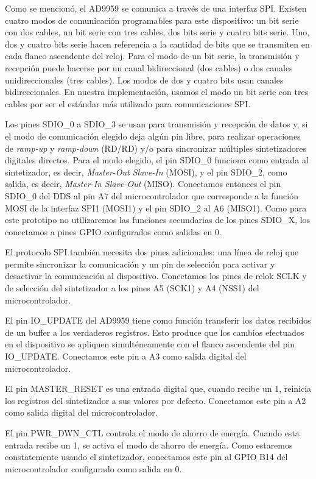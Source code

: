 \documentclass{article}
\newenvironment{standalone}{\begin{preview}}{\end{preview}}
\begin{document}
\begin{standalone}
  Como se mencionó, el AD9959 se comunica a través de una interfaz SPI.
  Existen cuatro modos de comunicación programables para este dispositivo: un bit serie con dos cables, un bit serie con tres cables, dos bits serie y cuatro bits serie.
  Uno, dos y cuatro bits serie hacen referencia a la cantidad de bits que se transmiten en cada flanco ascendente del reloj.
  Para el modo de un bit serie, la transmisión y recepción puede hacerse por un canal bidireccional (dos cables) o dos canales unidireccionales (tres cables).
  Los modos de dos y cuatro bits usan canales bidireccionales.
  En nuestra implementación, usamos el modo un bit serie con tres cables por ser el estándar más utilizado para comunicaciones SPI.

  Los pines SDIO\_0 a SDIO\_3 se usan para transmisión y recepción de datos y, si el modo de comunicación elegido deja algún pin libre, para realizar operaciones de \textit{ramp-up} y \textit{ramp-down} (RD/RD) y/o para sincronizar múltiples sintetizadores digitales directos.
  Para el modo elegido, el pin SDIO\_0 funciona como entrada al sintetizador, es decir, \textit{Master-Out Slave-In} (MOSI), y el pin SDIO\_2, como salida, es decir, \textit{Master-In Slave-Out} (MISO).
  Conectamos entonces el pin SDIO\_0 del DDS al pin A7 del microcontrolador que corresponde a la función MOSI de la interfaz SPI1 (MOSI1) y el pin SDIO\_2 al A6 (MISO1).
  Como para este prototipo no utilizaremos las funciones secundarias de los pines SDIO\_X, los conectamos a pines GPIO configurados como salidas en 0.

  El protocolo SPI también necesita dos pines adicionales: una línea de reloj que permite sincronizar la comunicación y un pin de selección para activar y desactivar la comunicación al dispositivo.
  Conectamos los pines de relok SCLK y de selección  del sintetizador a los pines A5 (SCK1) y A4 (NSS1) del microcontrolador.

  El pin IO\_UPDATE del AD9959 tiene como función transferir los datos recibidos de un buffer a los verdaderos registros.
  Esto produce que los cambios efectuados en el dispositivo se apliquen simulténeamente con el flanco ascendente del pin IO\_UPDATE.
  Conectamos este pin a A3 como salida digital del microcontrolador.

  El pin MASTER\_RESET es una entrada digital que, cuando recibe un 1, reinicia los registros del sintetizador a sus valores por defecto.
  Conectamos este pin a A2 como salida digital del microcontrolador.

  El pin PWR\_DWN\_CTL controla el modo de ahorro de energía.
  Cuando esta entrada recibe un 1, se activa el modo de ahorro de energía.
  Como estaremos constatemente usando el sintetizador, conectamos este pin al GPIO B14 del microcontrolador configurado como salida en 0.


\end{standalone}
\end{document}
